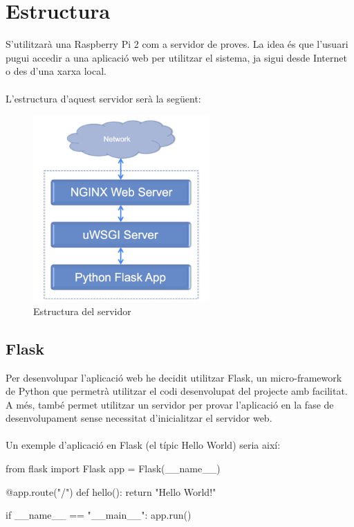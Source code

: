 \label{sec:Servidor}

\section{Estructura}
	S'utilitzarà una Raspberry Pi 2 com a servidor de proves. La idea és que l'usuari pugui accedir a una aplicació web per utilitzar el sistema, ja sigui desde Internet o des d'una xarxa local.\\\\
	L'estructura d'aquest servidor serà la següent:\\
	\begin{figure}[H]
			\centering
			\includegraphics[width=0.6\textwidth]{images/server}
			\caption[Estructura del servidor]{Estructura del servidor\protect\footnotemark}
	\end{figure}
	\subsection{Flask}
		Per desenvolupar l'aplicació web he decidit utilitzar Flask\cite{Flask}, un micro-framework de Python que permetrà utilitzar el codi desenvolupat del projecte amb facilitat.
		A més, també permet utilitzar un servidor per provar l'aplicació en la fase de desenvolupament sense necessitat d'inicialitzar el servidor web.\\\\
		Un exemple d'aplicació en Flask (el típic Hello World) seria així:\\
		\begin{python}
from flask import Flask
app = Flask(__name__)

@app.route("/")
def hello():
	return "Hello World!"

if __name__ == "__main__":
	app.run()
		\end{python}
